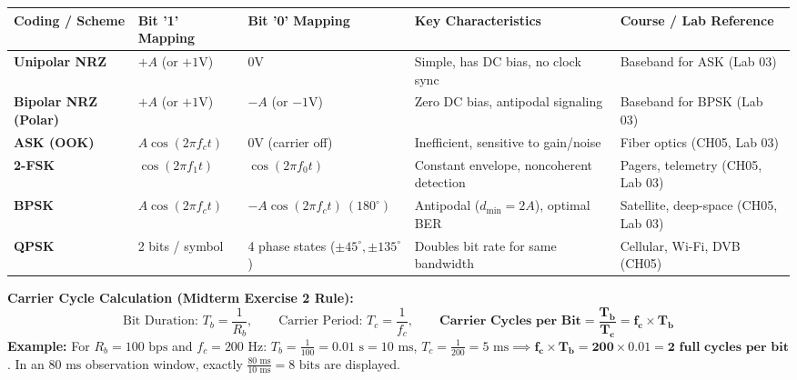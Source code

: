 \documentclass[10pt,a4paper]{article}
\begin{document}
\vspace{2pt}

\par\vspace{2pt}

\begin{center}
\small
\begin{tabular}{p{2.6cm} p{2.2cm} p{2.8cm} p{4.2cm} p{4.0cm}}
\toprule
\rowcolor{lightbg}
\textbf{Coding / Scheme} & \textbf{Bit '1' Mapping} & \textbf{Bit '0' Mapping} & \textbf{Key Characteristics} & \textbf{Course / Lab Reference} \\
\midrule
\textbf{Unipolar NRZ} & $+A$ (or $+1\text{V}$) & $0\text{V}$ & Simple, has DC bias, no clock sync & Baseband for ASK (Lab 03) \\
\textbf{Bipolar NRZ (Polar)} & $+A$ (or $+1\text{V}$) & $-A$ (or $-1\text{V}$) & Zero DC bias, antipodal signaling & Baseband for BPSK (Lab 03) \\
\midrule
\textbf{ASK (OOK)} & $A\cos(2\pi f_c t)$ & $0\text{V}$ (carrier off) & Inefficient, sensitive to gain/noise & Fiber optics (CH05, Lab 03) \\
\textbf{2-FSK} & $\cos(2\pi f_1 t)$ & $\cos(2\pi f_0 t)$ & Constant envelope, noncoherent detection & Pagers, telemetry (CH05, Lab 03) \\
\textbf{BPSK} & $A\cos(2\pi f_c t)$ & $-A\cos(2\pi f_c t)\ (180^\circ)$ & Antipodal ($d_{\min}=2A$), optimal BER & Satellite, deep-space (CH05, Lab 03) \\
\textbf{QPSK} & 2 bits / symbol & 4 phase states ($\pm 45^\circ, \pm 135^\circ$) & Doubles bit rate for same bandwidth & Cellular, Wi-Fi, DVB (CH05) \\
\bottomrule
\end{tabular}
\end{center}

\vspace{-4pt}

\begin{tcolorbox}[
    colframe=themeblue,
    colback=white,
    arc=1.2mm,
    boxrule=0.5pt,
    left=5pt, right=5pt, top=2.5pt, bottom=2.5pt
]
\footnotesize
\textbf{Carrier Cycle Calculation (Midterm Exercise 2 Rule):}
\begin{equation}
    \text{Bit Duration: } T_b = \frac{1}{R_b}, \qquad \text{Carrier Period: } T_c = \frac{1}{f_c}, \qquad \mathbf{\text{Carrier Cycles per Bit} = \frac{T_b}{T_c} = f_c \times T_b}
\end{equation}
\textbf{Example:} For $R_b = 100\text{ bps}$ and $f_c = 200\text{ Hz}$:
$T_b = \frac{1}{100} = 0.01\text{ s} = 10\text{ ms}$, $T_c = \frac{1}{200} = 5\text{ ms} \implies \mathbf{f_c \times T_b = 200 \times 0.01 = 2\text{ full cycles per bit}}$.
In an $80\text{ ms}$ observation window, exactly $\frac{80\text{ ms}}{10\text{ ms}} = 8\text{ bits}$ are displayed.
\end{tcolorbox}
\end{document}
